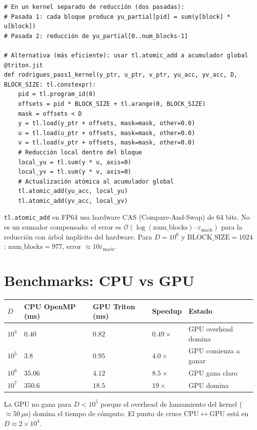 \begin{verbatim}
# En un kernel separado de reducción (dos pasadas):
# Pasada 1: cada bloque produce yu_partial[pid] = sum(y[block] * u[block])
# Pasada 2: reducción de yu_partial[0..num_blocks-1]

# Alternativa (más eficiente): usar tl.atomic_add a acumulador global
@triton.jit
def rodrigues_pass1_kernel(y_ptr, u_ptr, v_ptr, yu_acc, yv_acc, D, BLOCK_SIZE: tl.constexpr):
    pid = tl.program_id(0)
    offsets = pid * BLOCK_SIZE + tl.arange(0, BLOCK_SIZE)
    mask = offsets < D
    y = tl.load(y_ptr + offsets, mask=mask, other=0.0)
    u = tl.load(u_ptr + offsets, mask=mask, other=0.0)
    v = tl.load(v_ptr + offsets, mask=mask, other=0.0)
    # Reducción local dentro del bloque
    local_yu = tl.sum(y * u, axis=0)
    local_yv = tl.sum(y * v, axis=0)
    # Actualización atómica al acumulador global
    tl.atomic_add(yu_acc, local_yu)
    tl.atomic_add(yv_acc, local_yv)
\end{verbatim}

\begin{remark}
\texttt{tl.atomic\_add} en FP64 usa hardware CAS (Compare-And-Swap) de 64 bits.
No es un sumador compensado: el error es $\mathcal{O}(\log(\text{num\_blocks}) \cdot \varepsilon_{\text{mach}})$
para la reducción con árbol implícito del hardware. Para $D = 10^6$ y
$\text{BLOCK\_SIZE} = 1024$: $\text{num\_blocks} = 977$, error $\approx 10\varepsilon_{\text{mach}}$.
\end{remark}

\section{Benchmarks: CPU vs GPU}

\begin{tabular}{llll}
\hline
$D$ & CPU OpenMP (ms) & GPU Triton (ms) & Speedup & Estado \\
\hline
$10^4$   & $0.40$   & $0.82$  & $0.49\times$ & GPU overhead domina \\
$10^5$   & $3.8$    & $0.95$  & $4.0\times$  & GPU comienza a ganar \\
$10^6$   & $35.06$  & $4.12$  & $8.5\times$  & GPU gana claro \\
$10^7$   & $350.6$  & $18.5$  & $19\times$   & GPU domina \\
\hline


\end{tabular}

La GPU no gana para $D < 10^5$ porque el overhead de lanzamiento del kernel
($\approx 50\,\mu\text{s}$) domina el tiempo de cómputo. El punto de cruce
CPU$\leftrightarrow$GPU está en $D \approx 2 \times 10^4$.

